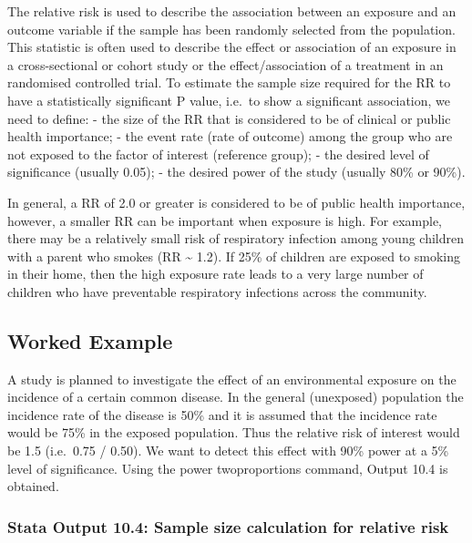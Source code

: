 \documentclass[
]{memoir}
\begin{document}
The relative risk is used to describe the association between an exposure and an outcome variable if the sample has been randomly selected from the population. This statistic is often used to describe the effect or association of an exposure in a cross-sectional or cohort study or the effect/association of a treatment in an randomised controlled trial. To estimate the sample size required for the RR to have a statistically significant P value, i.e.~to show a significant association, we need to define:
- the size of the RR that is considered to be of clinical or public health importance;
- the event rate (rate of outcome) among the group who are not exposed to the factor of interest (reference group);
- the desired level of significance (usually 0.05);
- the desired power of the study (usually 80\% or 90\%).

In general, a RR of 2.0 or greater is considered to be of public health importance, however, a smaller RR can be important when exposure is high. For example, there may be a relatively small risk of respiratory infection among young children with a parent who smokes (RR \textasciitilde{} 1.2). If 25\% of children are exposed to smoking in their home, then the high exposure rate leads to a very large number of children who have preventable respiratory infections across the community.

\hypertarget{wex10-4}{%
\subsection{Worked Example}\label{wex10-4}}

A study is planned to investigate the effect of an environmental exposure on the incidence of a certain common disease. In the general (unexposed) population the incidence rate of the disease is 50\% and it is assumed that the incidence rate would be 75\% in the exposed population. Thus the relative risk of interest would be 1.5 (i.e.~0.75 / 0.50). We want to detect this effect with 90\% power at a 5\% level of significance. Using the power twoproportions command, Output 10.4 is obtained.

\hypertarget{stata-output-10.4-sample-size-calculation-for-relative-risk}{%
\subsubsection{Stata Output 10.4: Sample size calculation for relative risk}\label{stata-output-10.4-sample-size-calculation-for-relative-risk}}
\end{document}
